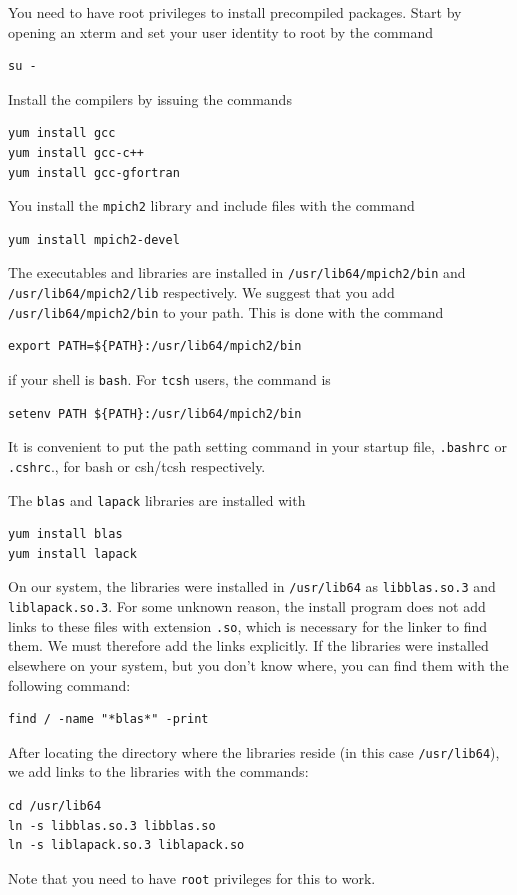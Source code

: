 \documentclass[11pt]{report}
\begin{document}
You need to have root privileges to install precompiled packages. Start by opening an xterm and
set your user identity to root by the command
\begin{verbatim}
su -
\end{verbatim}
Install the compilers by issuing the commands
\begin{verbatim}
yum install gcc
yum install gcc-c++
yum install gcc-gfortran
\end{verbatim}
You install the \verb+mpich2+ library and include files with the command
\begin{verbatim}
yum install mpich2-devel
\end{verbatim}
The executables and libraries are installed in \verb+/usr/lib64/mpich2/bin+ and 
\verb+/usr/lib64/mpich2/lib+ respectively. We suggest that you add \verb+/usr/lib64/mpich2/bin+ to 
your path. This is done with the command
\begin{verbatim}
export PATH=${PATH}:/usr/lib64/mpich2/bin
\end{verbatim}
if your shell is \verb+bash+. For \verb+tcsh+ users, the command is
\begin{verbatim}
setenv PATH ${PATH}:/usr/lib64/mpich2/bin
\end{verbatim}
It is convenient to put the path setting command in
your startup file, \verb+.bashrc+ or \verb+.cshrc+., for bash or csh/tcsh respectively.

The \verb+blas+ and \verb+lapack+ libraries are installed with
\begin{verbatim}
yum install blas
yum install lapack
\end{verbatim}
On our system, the libraries were installed in \verb+/usr/lib64+ as \verb+libblas.so.3+ and
\verb+liblapack.so.3+. For some unknown reason, the install program does not add links to these
files with extension \verb+.so+, which is necessary for the linker to find them. We must therefore
add the links explicitly. If the libraries were installed elsewhere on your system, but you don't
know where, you can find them with the following command:
\begin{verbatim}
find / -name "*blas*" -print
\end{verbatim}
After locating the directory where the libraries reside (in this case \verb+/usr/lib64+), we add
links to the libraries with the commands:
\begin{verbatim}
cd /usr/lib64
ln -s libblas.so.3 libblas.so
ln -s liblapack.so.3 liblapack.so
\end{verbatim}
Note that you need to have \verb+root+ privileges for this to work.
\end{document}
